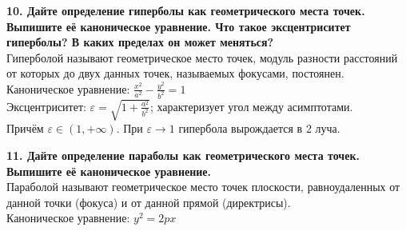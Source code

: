 \documentclass[11pt,a4paper]{article}
\begin{document}
\textbf{10. Дайте определение гиперболы как геометрического места точек. Выпишите её каноническое уравнение. Что такое эксцентриситет гиперболы? В каких пределах он может меняться?\\}
Гиперболой называют геометрическое место точек, модуль разности расстояний от которых до двух данных точек, называемых фокусами, постоянен.
\\
Каноническое уравнение: $\frac{x^2}{a^2} - \frac{y^2}{b^2} = 1$
\\
Эксцентриситет: $\varepsilon = \sqrt{1 + \frac{a^2}{b^2}}$; характеризует угол между асимптотами.
\\
Причём $\varepsilon \in (1, +\infty)$. При $\varepsilon \to 1$ гипербола вырождается в 2 луча.

\textbf{11. Дайте определение параболы как геометрического места точек. Выпишите её каноническое уравнение.\\}
Параболой называют геометрическое место точек плоскости, равноудаленных от данной точки (фокуса) и от данной прямой (директрисы).
\\
Каноническое уравнение: $y^2 = 2px$
\end{document}
